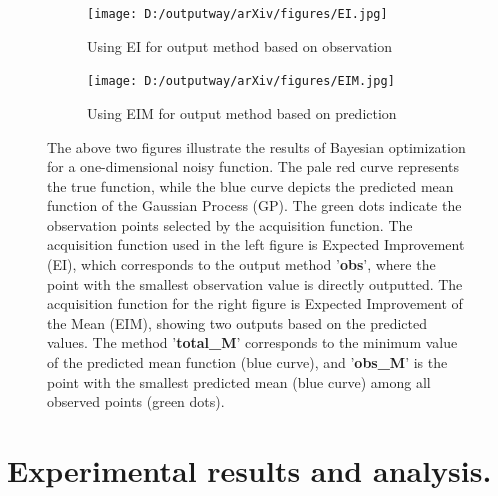 \documentclass{article}
\begin{document}
\begin{figure}[H]
    \centering
    \begin{subfigure}[t]{.42\linewidth}
        \centering
        \texttt{[image: D:/outputway/arXiv/figures/EI.jpg]}
        \caption{Using EI for output method based on observation}
    \end{subfigure}
    \begin{subfigure}[t]{.42\linewidth}
        \centering
        \texttt{[image: D:/outputway/arXiv/figures/EIM.jpg]}
        \caption{Using EIM for output method based on prediction}
    \end{subfigure}
    \caption{The above two figures illustrate the results of Bayesian optimization for a one-dimensional noisy function. The pale red curve represents the true function, while the blue curve depicts the predicted mean function of the Gaussian Process (GP). The green dots indicate the observation points selected by the acquisition function. The acquisition function used in the left figure is Expected Improvement (EI), which corresponds to the output method '\textbf{obs}', where the point with the smallest observation value is directly outputted. The acquisition function for the right figure is Expected Improvement of the Mean (EIM), showing two outputs based on the predicted values. The method '\textbf{total\_M}' corresponds to the minimum value of the predicted mean function (blue curve), and '\textbf{obs\_M}' is the point with the smallest predicted mean (blue curve) among all observed points (green dots).}
    \label{Fig1}
\end{figure}




\section{Experimental results and analysis.}
\end{document}
